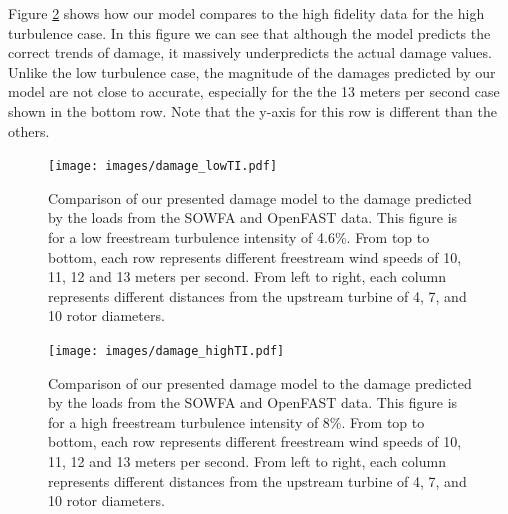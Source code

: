\documentclass[11pt,letterpaper]{article}
\begin{document}
Figure \ref{high_TI} shows how our model compares to the high fidelity data for the high turbulence case. In this figure we can see that although the model predicts the correct trends of damage, it massively underpredicts the actual damage values. Unlike the low turbulence case, the magnitude of the damages predicted by our model are not close to accurate, especially for the the 13 meters per second case shown in the bottom row. Note that the y-axis for this row is different than the others.
% 
\begin{figure}
    \centering
    \texttt{[image: images/damage\_lowTI.pdf]}
    \caption{Comparison of our presented damage model to the damage predicted by the loads from the SOWFA and OpenFAST data. This figure is for a low freestream turbulence intensity of 4.6\%. From top to bottom, each row represents different freestream wind speeds of 10, 11, 12 and 13 meters per second. From left to right, each column represents different distances from the upstream turbine of 4, 7, and 10 rotor diameters.}
    \label{low_TI}
\end{figure}
% 
\begin{figure}
    \centering
    \texttt{[image: images/damage\_highTI.pdf]}
    \caption{Comparison of our presented damage model to the damage predicted by the loads from the SOWFA and OpenFAST data. This figure is for a high freestream turbulence intensity of 8\%. From top to bottom, each row represents different freestream wind speeds of 10, 11, 12 and 13 meters per second. From left to right, each column represents different distances from the upstream turbine of 4, 7, and 10 rotor diameters.}
    \label{high_TI}
\end{figure}
\end{document}
